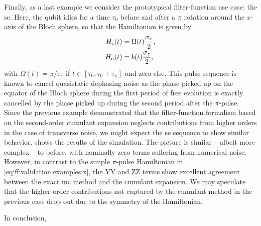 Finally, as a last example we consider the prototypical filter-function use case: the \gls{se}.
Here, the qubit idles for a time $\tau_{0}$ before and after a $\pi$ rotation around the $x$-axis of the Bloch sphere, so that the Hamiltonian is given by
\begin{equation}\label{eq:ff:validation:examples:se}
    \begin{split}
        H_{\mathrm{c}}(t) &= \Omega(t)\frac{\sigma_x}{2}, \\
        H_{\mathrm{n}}(t) &= b(t)\frac{\sigma_z}{2},
    \end{split}
\end{equation}
with $\Omega(t) = \pi/\tau_\pi$ if $t\in[\tau_0, \tau_0+\tau_\pi]$ and zero else.
This pulse sequence is known to cancel quasistatic dephasing noise as the phase picked up on the equator of the Bloch sphere during the first period of free evolution is exactly cancelled by the phase picked up during the second period after the $\pi$-pulse.
Since the previous example demonstrated that the filter-function formalism based on the second-order cumulant expansion neglects contributions from higher orders in the case of transverse noise, we might expect the \gls{se} sequence to show similar behavior.
 shows the results of the simulation.
The picture is similar -- albeit more complex -- to before, with nominally-zero terms suffering from numerical noise.
However, in contrast to the simple $\pi$-pulse Hamiltonian in \cref{eq:ff:validation:examples:x}, the YY and ZZ terms show excellent agreement between the exact \gls{mc} method and the cumulant expansion.
We may speculate that the higher-order contributions not captured by the cumulant method in the previous case drop out due to the symmetry of the Hamiltonian.

In conclusion,